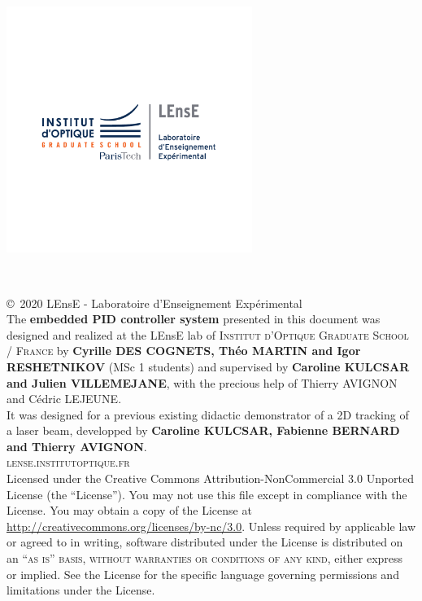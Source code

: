 \documentclass[14pt,fleqn]{book} %
\begin{document}
\vfill
\begin{center}
	\includegraphics[width=8cm]{global_pictures/LEnsE_logo.pdf}
\end{center}
\endgroup


\newpage
~\vfill
\thispagestyle{empty}

\noindent \copyright\ 2020 LEnsE - Laboratoire d'Enseignement Expérimental\\ %

\noindent The \textbf{embedded PID controller system} presented in this document was designed and realized at the LEnsE lab of \textsc{Institut d'Optique Graduate School / France} by \textbf{Cyrille DES COGNETS, Théo MARTIN and Igor RESHETNIKOV} (MSc 1 students) and supervised by \textbf{Caroline KULCSAR and Julien VILLEMEJANE}, with the precious help of Thierry AVIGNON and Cédric LEJEUNE.\\ 

\noindent It was designed for a previous existing didactic demonstrator of a 2D tracking of a laser beam, developped by \textbf{Caroline KULCSAR, Fabienne BERNARD and Thierry AVIGNON}.\\

\noindent \textsc{lense.institutoptique.fr}\\ %

\noindent Licensed under the Creative Commons Attribution-NonCommercial 3.0 Unported License (the ``License''). You may not use this file except in compliance with the License. You may obtain a copy of the License at \url{http://creativecommons.org/licenses/by-nc/3.0}. Unless required by applicable law or agreed to in writing, software distributed under the License is distributed on an \textsc{``as is'' basis, without warranties or conditions of any kind}, either express or implied. See the License for the specific language governing permissions and limitations under the License.\\ %
\end{document}
